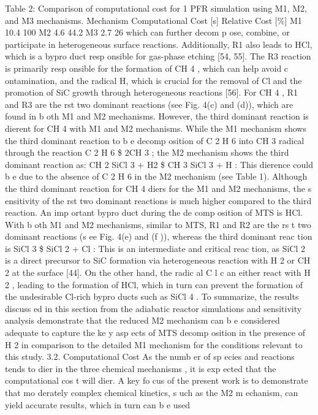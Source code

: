 \documentclass[10pt, letterpaper]{article}
\begin{document}
Table 2: Comparison of computational cost for 1 PFR simulation using M1, M2, and M3 mechanisms.
Mechanism
Computational Cost [s]
Relative Cost [\%]
M1
10.4
100
M2
4.6
44.2
M3
2.7
26
which can further decom p ose, combine, or participate in heterogeneous surface reactions. Additionally,
R1 also leads to HCl, which is a bypro duct resp onsible for gas-phase etching [54, 55]. The R3 reaction is
primarily resp onsible for the formation of CH
4
, which can help avoid c ontamination, and the radical H,
which is crucial for the removal of Cl and the promotion of SiC growth through heterogeneous reactions [56].
For CH
4
, R1 and R3 are the rst two dominant reactions (see Fig. 4(c) and (d)), which are found in
b oth M1 and M2 mechanisms. However, the third dominant reaction is dierent for CH
4
with M1 and M2
mechanisms. While the M1 mechanism shows the third dominant reaction to b e decomp osition of C
2
H
6
into
CH
3
radical through the reaction
C
2
H
6
\$
2CH
3
;
the M2 mechanism shows the third dominant reaction as:
CH
2
SiCl
3
+ H2
\$
CH
3
SiCl
3
+ H
:
This dierence could b e due to the absence of C
2
H
6
in the M2 mechanism (see Table 1). Although the third
dominant reaction for CH
4
diers for the M1 and M2 mechanisms, the s ensitivity of the rst two dominant
reactions is much higher compared to the third reaction.
An imp ortant bypro duct during the de comp osition of MTS is HCl. With b oth M1 and M2 mechanisms,
similar to MTS, R1 and R2 are the rs t two dominant reactions (s ee Fig. 4(e) and (f )), whereas the third
dominant reac tion is
SiCl
3
\$
SiCl
2
+ Cl
:
This is an intermediate and critical reac tion, as SiCl
2
is a direct precursor to SiC formation via heterogeneous
reaction with H
2
or CH
2
at the surface [44]. On the other hand, the radic al C l c an either react with H
2
,
leading to the formation of HCl, which in turn can prevent the formation of the undesirable Cl-rich bypro ducts
such as SiCl
4
.
To summarize, the results discuss ed in this section from the adiabatic reactor simulations and sensitivity
analysis demonstrate that the reduced M2 mechanism can b e considered adequate to capture the ke y asp ects
of MTS decomp osition in the presence of H
2
in comparison to the detailed M1 mechanism for the conditions
relevant to this study.
3.2. Computational Cost
As the numb er of sp ecies and reactions tends to dier in the three chemical mechanisms , it is exp ected
that the computational cos t will dier. A key fo cus of the present work is to demonstrate that mo derately
complex chemical kinetics, s uch as the M2 m echanism, can yield accurate results, which in turn can b e used
\end{document}
